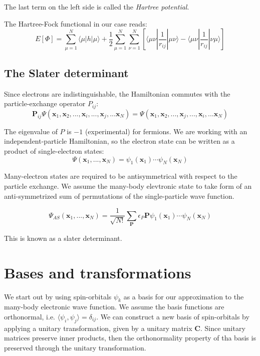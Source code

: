 \documentclass[a4paper,10pt, twocolumn]{article}
\newcommand{\xvec}{\mathbf{x}}
\newcommand{\Pvec}{\mathbf{P}}
\newcommand{\mb}{\mathbf}
\begin{document}
The last term on the left side is called the \emph{Hartree potential}. 

The Hartree-Fock functional in our case reads:
\begin{equation}
	E[\Phi] = \sum_{\mu = 1}^N \langle \mu |h|\mu \rangle + \frac{1}{2} \sum_{\mu = 1}^N\sum_{\nu=1}^N \left[ \langle \mu\nu |\frac{1}{r_{ij}}| \mu\nu\rangle - \langle \mu\nu |\frac{1}{r_{ij}}| \nu\mu\rangle \right]
\end{equation}

\subsection{The Slater determinant}
Since electrons are indistinguishable, the Hamiltonian commutes with the particle-exchange operator $P_{ij}$:
\begin{equation}
	\Pvec_{ij}\Psi(\xvec_1, \xvec_2, ..., \xvec_i, ..., \xvec_j, ... \xvec_N) = \Psi(\xvec_1, \xvec_2, ..., \xvec_j, ..., \xvec_i, ... \xvec_N)
\end{equation}

The eigenvalue of $P$ is $-1$ (experimental) for fermions. We are working with an independent-particle Hamiltonian, so the electron state can be written as a product of single-electron states:
\begin{equation}
	\Psi(\xvec_1, ..., \xvec_N) = \psi_1(\xvec_1)\cdots\psi_N(\xvec_N)
\end{equation}

Many-electron states are required to be antisymmetrical with respect to the particle exchange. We assume the many-body elevtronic state to take form of an anti-symmetrized sum of permutations of the single-particle wave function. 

\begin{equation}
	\Psi_{AS} (\xvec_1, ..., \xvec_N) = \frac{1}{\sqrt{N!}} \sum_\mb{P} \epsilon_P \mb{P} \psi_1(\xvec_1) \cdots \psi_N(\xvec_N)
\end{equation}

This is known as a slater determinant.

\section{Bases and transformations}
We start out by using spin-orbitals $\psi_k$ as a basis for our approximation to the many-body electronic wave function. We assume the basis functions are orthonormal, i.e. $\langle \psi_i, \psi_j \rangle = \delta_{ij}$. We can construct a new basis of spin-orbitals by applying a unitary transformation, given by a unitary matrix $\mb{C}$. Since unitary matrices preserve inner products, then the orthonormality property of tha basis is preserved through the unitary transformation. 
\end{document}

